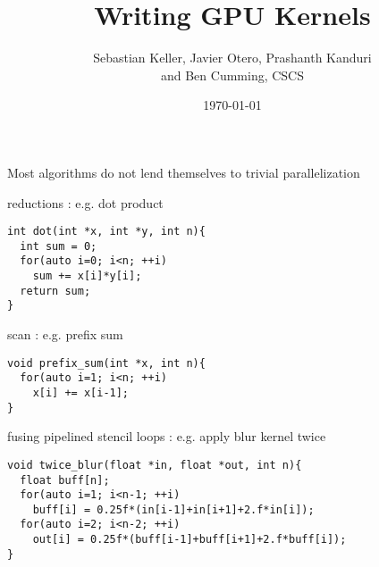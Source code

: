 \documentclass[aspectratio=43]{beamer}
\author{Sebastian Keller, Javier Otero, Prashanth Kanduri\\ and Ben Cumming, CSCS}
\title{Writing GPU Kernels}
\subtitle{}
\date{\today}
\begin{document}
\cscstitle


\begin{frame}[fragile]{}
    \centering
    Most algorithms do not lend themselves to trivial parallelization

    \begin{code}{reductions : e.g. dot product}
        \begin{lstlisting}[style=boxcudatiny]
int dot(int *x, int *y, int n){
  int sum = 0;
  for(auto i=0; i<n; ++i)
    sum += x[i]*y[i];
  return sum;
}
        \end{lstlisting}
    \end{code}
\vspace{-7pt}
        \begin{code}{scan : e.g. prefix sum}
            \begin{lstlisting}[style=boxcudatiny]
void prefix_sum(int *x, int n){
  for(auto i=1; i<n; ++i)
    x[i] += x[i-1];
}
        \end{lstlisting}
    \end{code}
\vspace{-7pt}
    \begin{code}{fusing pipelined stencil loops : e.g. apply blur kernel twice}
        \begin{lstlisting}[style=boxcudatiny]
void twice_blur(float *in, float *out, int n){
  float buff[n];
  for(auto i=1; i<n-1; ++i)
    buff[i] = 0.25f*(in[i-1]+in[i+1]+2.f*in[i]);
  for(auto i=2; i<n-2; ++i)
    out[i] = 0.25f*(buff[i-1]+buff[i+1]+2.f*buff[i]);
}
        \end{lstlisting}
    \end{code}

\end{frame}
\end{document}
